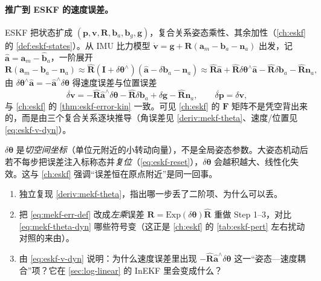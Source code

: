 \paragraph{推广到 ESKF 的速度误差。}ESKF 把状态扩成 $(\mathbf{p},\mathbf{v},\mathbf{R},\mathbf{b}_a,\mathbf{b}_g,\mathbf{g})$，复合关系姿态乘性、其余加性（\cref{ch:eskf} 的 \cref{def:eskf-states}）。从 IMU 比力模型 $\dot{\mathbf{v}}=\mathbf{g}+\mathbf{R}(\mathbf{a}_m-\mathbf{b}_a-\mathbf{n}_a)$ 出发，记 $\hat{\mathbf{a}}=\mathbf{a}_m-\hat{\mathbf{b}}_a$，一阶展开
\[
  \mathbf{R}(\mathbf{a}_m-\mathbf{b}_a-\mathbf{n}_a)\approx\hat{\mathbf{R}}(\mathbf{I}+\delta\boldsymbol{\theta}^\wedge)(\hat{\mathbf{a}}-\delta\mathbf{b}_a-\mathbf{n}_a)
  \approx\hat{\mathbf{R}}\hat{\mathbf{a}}+\hat{\mathbf{R}}\delta\boldsymbol{\theta}^\wedge\hat{\mathbf{a}}-\hat{\mathbf{R}}\delta\mathbf{b}_a-\hat{\mathbf{R}}\mathbf{n}_a,
\]
由 $\delta\boldsymbol{\theta}^\wedge\hat{\mathbf{a}}=-\hat{\mathbf{a}}^\wedge\delta\boldsymbol{\theta}$ 得速度误差与位置误差
\begin{equation}
  \dot{\delta\mathbf{v}}=-\hat{\mathbf{R}}\hat{\mathbf{a}}^\wedge\delta\boldsymbol{\theta}-\hat{\mathbf{R}}\delta\mathbf{b}_a+\delta\mathbf{g}-\hat{\mathbf{R}}\mathbf{n}_a,\qquad
  \dot{\delta\mathbf{p}}=\delta\mathbf{v},
  \label{eq:eskf-v-dyn}
\end{equation}
与 \cref{ch:eskf} 的 \cref{thm:eskf-error-kin} 一致。可见 \cref{ch:eskf} 的 $\mathbf{F}$ 矩阵不是凭空背出来的，而是由三个复合关系逐块推导（角误差见 \cref{deriv:mekf-theta}、速度/位置见 \cref{eq:eskf-v-dyn}）。

\begin{pitfall}
$\delta\boldsymbol{\theta}$ 是\emph{切空间坐标}（单位元附近的小转动向量），不是全局姿态参数。大姿态机动后若不每步把误差注入标称态并\emph{复位}（\cref{eq:eskf-reset}），$\delta\boldsymbol{\theta}$ 会越积越大、线性化失效。这与 \cref{ch:eskf} 强调“误差恒在原点附近”是同一回事。
\end{pitfall}

\begin{practice}
\begin{enumerate}
  \item 独立复现 \cref{deriv:mekf-theta}，指出哪一步丢了二阶项、为什么可以丢。
  \item 把 \cref{eq:mekf-err-def} 改成\emph{左乘}误差 $\mathbf{R}=\mathrm{Exp}(\delta\boldsymbol{\theta})\hat{\mathbf{R}}$ 重做 Step 1--3，对比 \cref{eq:mekf-theta-dyn} 哪些符号变（这正是 \cref{ch:eskf} 的 \cref{tab:eskf-pert} 左右扰动对照的来由）。
  \item 由 \cref{eq:eskf-v-dyn} 说明：为什么速度误差里出现 $-\hat{\mathbf{R}}\hat{\mathbf{a}}^\wedge\delta\boldsymbol{\theta}$ 这一“姿态—速度耦合”项？它在 \cref{sec:log-linear} 的 InEKF 里会变成什么？
\end{enumerate}
\end{practice}

